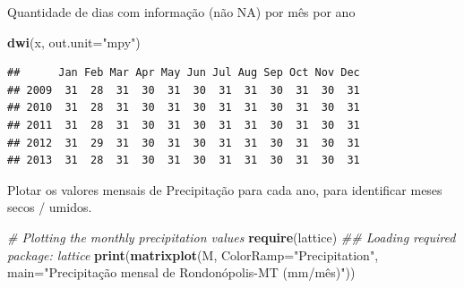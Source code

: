 \documentclass[
]{book}
\newenvironment{Shaded}{\begin{snugshade}}{\end{snugshade}}
\newcommand{\CommentTok}[1]{\textcolor[rgb]{0.56,0.35,0.01}{\textit{#1}}}
\newcommand{\DataTypeTok}[1]{\textcolor[rgb]{0.13,0.29,0.53}{#1}}
\newcommand{\DecValTok}[1]{\textcolor[rgb]{0.00,0.00,0.81}{#1}}
\newcommand{\KeywordTok}[1]{\textcolor[rgb]{0.13,0.29,0.53}{\textbf{#1}}}
\newcommand{\NormalTok}[1]{#1}
\newcommand{\OtherTok}[1]{\textcolor[rgb]{0.56,0.35,0.01}{#1}}
\newcommand{\StringTok}[1]{\textcolor[rgb]{0.31,0.60,0.02}{#1}}
\begin{document}
Quantidade de dias com informação (não NA) por mês por ano

\begin{Shaded}
\begin{Highlighting}[]
\KeywordTok{dwi}\NormalTok{(x, }\DataTypeTok{out.unit=}\StringTok{"mpy"}\NormalTok{)}
\end{Highlighting}
\end{Shaded}

\begin{verbatim}
##      Jan Feb Mar Apr May Jun Jul Aug Sep Oct Nov Dec
## 2009  31  28  31  30  31  30  31  31  30  31  30  31
## 2010  31  28  31  30  31  30  31  31  30  31  30  31
## 2011  31  28  31  30  31  30  31  31  30  31  30  31
## 2012  31  29  31  30  31  30  31  31  30  31  30  31
## 2013  31  28  31  30  31  30  31  31  30  31  30  31
\end{verbatim}

Plotar os valores mensais de Precipitação para cada ano, para identificar meses secos / umidos.

\begin{Shaded}
\end{Shaded}

\begin{Shaded}
\begin{Highlighting}[]
\CommentTok{# Plotting the monthly precipitation values}
\KeywordTok{require}\NormalTok{(lattice)}
\CommentTok{## Loading required package: lattice}
\KeywordTok{print}\NormalTok{(}\KeywordTok{matrixplot}\NormalTok{(M, }\DataTypeTok{ColorRamp=}\StringTok{"Precipitation"}\NormalTok{,}
\DataTypeTok{main=}\StringTok{"Precipitação mensal de Rondonópolis-MT (mm/mês)"}\NormalTok{))}
\end{Highlighting}
\end{Shaded}
\end{document}
